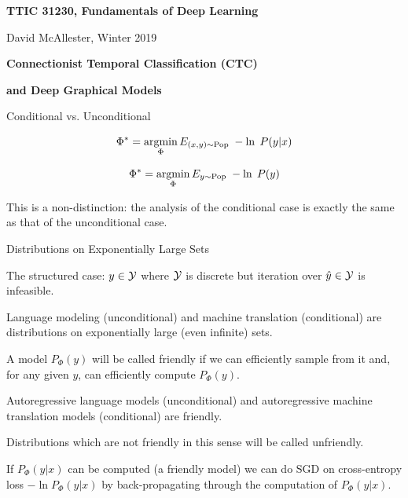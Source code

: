




{\Huge

  \centerline{\bf TTIC 31230, Fundamentals of Deep Learning}
  \bigskip
  \centerline{David McAllester, Winter 2019}
  \vfill
  \centerline{\bf Connectionist Temporal Classification (CTC)}
  \vfill
  \centerline{\bf and Deep Graphical Models}
\vfill
\vfill
\vfill
{}
{Conditional vs. Unconditional}

\vfill
{\color{red}
$$\Phi^* = \operatorname*{argmin}_\Phi E_{(x,y) \sim \mathrm{Pop}}\;-\ln \;P(y|x)$$

\vfill
$$\Phi^* = \operatorname*{argmin}_\Phi E_{y \sim \mathrm{Pop}}\;-\ln \;P(y)$$
}

\vfill
This is a non-distinction: the analysis of the conditional case
is exactly the same as that of the unconditional case.

{Distributions on Exponentially Large Sets}

{\color{red} The structured case:} $y \in {\cal Y}$ where ${\cal Y}$ is discrete but {\color{red} iteration over $\hat{y} \in {\cal Y}$ is infeasible}.

\vfill
{\color{red} Language modeling} (unconditional) and {\color{red} machine translation} (conditional) are distributions on exponentially large (even infinite) sets.


A model $P_\Phi(y)$ will be called {\color{red} friendly} if we can efficiently sample from it and, for any given $y$, can efficiently compute $P_\Phi(y)$.

\vfill
{\color{red} Autoregressive} language models (unconditional) and autoregressive machine translation models (conditional) are {\color{red} friendly}.


\vfill
Distributions which are not friendly in this sense will be called {\color{red} unfriendly}.



{\color{red} If $P_\Phi(y|x)$ can be computed} (a friendly model)
we can do SGD on cross-entropy loss {\color{red} $- \ln P_\Phi(y|x)$} by back-propagating
through the computation of $P_\Phi(y|x)$.


}
